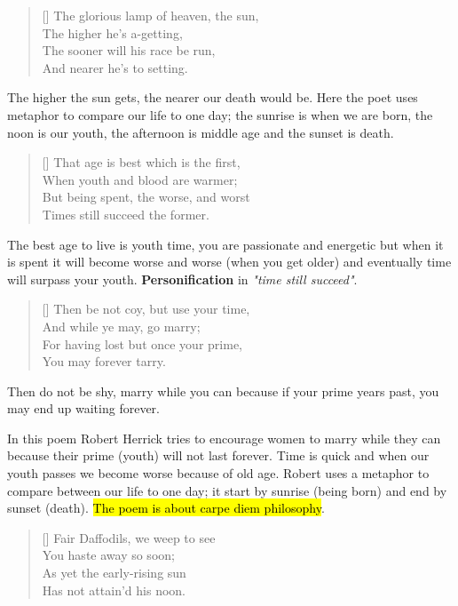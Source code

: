 \begin{verse}[\versewidth]
{\fontverse
The glorious lamp of heaven, the sun,\\
The higher he’s a-getting,\\
The sooner will his race be run,\\
And nearer he’s to setting.
} 
\end{verse}

The higher the sun gets, the nearer our death would be. Here the poet 
uses metaphor to compare our life to one day; the sunrise 
is when we are born, the noon is our youth, the afternoon is middle age and
the sunset is death. 

\begin{verse}[\versewidth]
{\fontverse
That age is best which is the first,\\
When youth and blood are warmer;\\
But being spent, the worse, and worst\\
Times still succeed the former. 
} 
\end{verse}

The best age to live is youth time, you are passionate and energetic
but when it is spent it will become worse and worse (when you get older)
and eventually time will surpass your youth. \textbf{Personification} in \textit{"time still succeed"}.

\begin{verse}[\versewidth]
{\fontverse
Then be not coy, but use your time,\\
And while ye may, go marry;\\
For having lost but once your prime,\\
You may forever tarry.
} 
\end{verse}

Then do not be shy, marry while you can because if
your prime years past, you may end up waiting forever.



In this poem Robert Herrick tries to encourage women to marry while they can
because their prime (youth) will not last forever.
Time is quick and when our youth passes we become worse because of old age. 
Robert uses a metaphor to compare between our life to one day;
it start by sunrise (being born) and end by sunset (death).
\hl{The poem is about carpe diem philosophy}.

\newpage
{}
\settowidth{\versewidth}{Fair Daffodils, we weep to see}
\begin{verse}[\versewidth]
{\fontverse
Fair Daffodils, we weep to see\\
You haste away so soon;\\
As yet the early-rising sun\\
Has not attain'd his noon.
} 
\end{verse}

